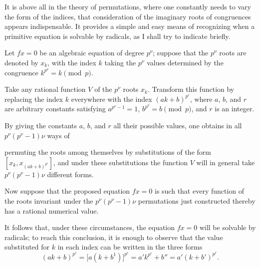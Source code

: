 
It is above all in the theory of permutations, where one constantly
needs to vary the form of the indices, that consideration of the
imaginary roots of congruences appears indispensable. It provides a
simple and easy means of recognizing when a primitive equation is
solvable by radicals, as I shall try to indicate briefly.

Let $fx=0$ be an algebraic equation of degree $p^\nu$; suppose that the
$p^\nu$ roots are denoted by $x_k$, with the index $k$ taking the
$p^\nu$ values determined by the congruence $k^{p^\nu}=k\pmod p$.

Take any rational function $V$ of the $p^\nu$ roots $x_k$. Transform this
function by replacing the index $k$ everywhere with the index
$(ak+b)^{p^r}$, where $a$, $b$, and $r$ are arbitrary constants satisfying
$a^{p^\nu-1}=1$, $b^{p^\nu}=b\pmod p$, and $r$ is an integer.

By giving the constants $a$, $b$, and $r$ all their possible values, one
obtains in all $p^\nu(p^\nu-1)\nu$ ways of


permuting the roots among themselves by substitutions of the form
$[x_k,x_{(ak+b)^{p^r}}]$, and under these substitutions the function $V$
will in general take $p^\nu(p^\nu-1)\nu$ different forms.

Now suppose that the proposed equation $fx=0$ is such that every
function of the roots invariant under the $p^\nu(p^\nu-1)\nu$
permutations just constructed thereby has a rational numerical value.

It follows that, under these circumstances, the equation $fx=0$ will be
solvable by radicals; to reach this conclusion, it is enough to observe
that the value substituted for $k$ in each index can be written in the
three forms
\[
(ak+b)^{p^r}
=\bigl[a(k+b^{1})\bigr]^{p^r}
=a'k^{p^r}+b''
=a'(k+b')^{p^r}.
\]


